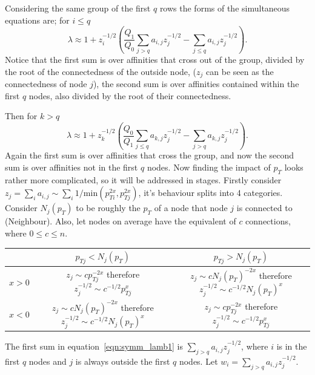 Considering the same group of the first \(q\) rows the forms of the simultaneous equations are;
for \(i \leq q\)
\begin{equation}\label{eqn:symm_lamb1}
\lambda \approx 1 + z_i^{-1/2} \left(\frac{Q_1}{Q_0}\sum_{j>q}a_{i,j}z_j^{-1/2} - \sum_{j \leq q} a_{i,j}z_j^{-1/2}\right).
\end{equation}
Notice that the first sum is over affinities that cross out of the group, divided by the root of the connectedness of the outside node,
(\(z_j\) can be seen as the connectedness of node \(j\)), the second sum is over affinities contained within the first \(q\) nodes,
also divided by the root of their connectedness.

Then for \(k > q\)
\begin{equation} \lambda \approx 1 + z_k^{-1/2} \left(\frac{Q_0}{Q_1}\sum_{j\leq q}a_{k,j}z_j^{-1/2} - \sum_{j > q} a_{k,j}z_j^{-1/2}\right).\end{equation}
Again the first sum is over affinities that cross the group, and now the second sum is over affinities not in the first \(q\) nodes.
Now finding the impact of \(p_T\) looks rather more complicated,
so it will be addressed in stages.
Firstly consider \(z_j = \sum_i a_{i,j} \sim \sum_i 1/\text{min}(p_{Ti}^{2x}, p_{Tj}^{2x}) \),
it's behaviour splits into 4 categories.
Consider \(N_j(p_T)\) to be roughly the \(p_T\) of a node that node \(j\) is connected to (Neighbour).
Also, let nodes on average have the equivalent of \(c\) connections, where \(0 \leq c \leq n\).
\begin{center}  %
    \begin{tabular}{c | c c}
                & \(p_{Tj} < N_j(p_T)\) & \(p_{Tj} > N_j(p_T)\) \\
        \hline
        \(x>0\) & \(z_j \sim cp_{Tj}^{-2x}\) therefore \(z_j^{-1/2} \sim c^{-1/2} p_{Tj}^{x}\) & \(z_j \sim cN_j(p_T)^{-2x}\) therefore \(z_j^{-1/2} \sim c^{-1/2}N_j(p_T)^{x}\)\\
        \(x<0\) & \(z_j \sim cN_j(p_T)^{-2x}\) therefore \(z_j^{-1/2} \sim c^{-1/2}N_j(p_T)^{x}\) & \(z_j \sim cp_{Tj}^{-2x}\) therefore \(z_j^{-1/2} \sim c^{-1/2} p_{Tj}^{x}\)\\
    \end{tabular}
\end{center}
The first sum in equation~\ref{eqn:symm_lamb1} is \(\sum_{j>q}a_{i,j} z_j^{-1/2}\),
where \(i\) is in the first \(q\) nodes and \(j\) is always outside the first \(q\) nodes.
Let \(w_{i} = \sum_{j>q}a_{i,j} z_j^{-1/2}\).

